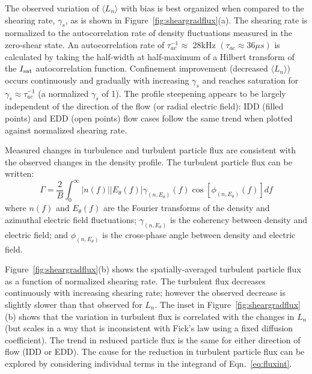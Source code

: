 \documentclass[aps,prl,amsmath,amssymb,preprint,superscriptaddress]{revtex4} %
\begin{document}
The observed variation of $\langle L_{n} \rangle$ with bias is best
organized when compared to the shearing rate, $\gamma_{s}$, as is
shown in Figure~\ref{fig:sheargradflux}(a).   The shearing rate is
normalized to the autocorrelation rate of density fluctuations
measured in the zero-shear state.  An autocorrelation rate of $\tau_{ac}^{-1} \approx $ 28kHz $(\tau_{ac} \approx 36\mu s)$ is calculated by taking the half-width at half-maximum of a Hilbert transform of the $I_{\rm sat}$
autocorrelation function.  Confinement improvement (decreased $\langle
L_n \rangle$) occurs continuously and gradually with increasing
$\gamma_{s}$ and reaches saturation for $\gamma_{s} \approx \tau_{ac}^{-1}$ (a normalized $\gamma_{s}$ of 1).  The profile steepening
appears to be largely independent of the direction of the flow (or radial electric field): IDD (filled points) and EDD (open points) flow cases follow the same trend when plotted against normalized shearing rate.

Measured changes in turbulence and turbulent particle flux are
consistent with the observed changes in the density profile.  The
turbulent particle flux can be written\cite{powers74}:
\begin{equation}
\Gamma = \frac{2}{B} \int^{\infty}_{0} \lvert n(f) \rvert \lvert E_{\theta}(f) \rvert \gamma_{(n,E_{\theta})}(f) \cos [\phi_{(n,E_{\theta})}(f)] df
\label{eq:fluxint}
\end{equation}
where $n(f)$ and $E_\theta(f)$ are the Fourier transforms of
the density and azimuthal electric field fluctuations;
$\gamma_{(n,E_\theta)}$ is the coherency between density and electric
field; and $\phi_{(n,E_\theta)}$ is the cross-phase angle between
density and electric field.

Figure~\ref{fig:sheargradflux}(b) shows the spatially-averaged turbulent
particle flux as a function of normalized shearing rate.  The
turbulent flux decreases continuously with increasing shearing rate;
however the observed decrease is slightly slower than that observed
for $L_n$.  The inset in Figure~\ref{fig:sheargradflux}(b) shows that the variation in
turbulent flux is correlated with the changes in $L_n$ (but scales in a way
that is inconsistent with Fick's law using a fixed diffusion coefficient).  The
trend in reduced particle flux is the same for either direction of
flow (IDD or EDD).  The cause for the reduction in turbulent particle
flux can be explored by considering individual terms in the integrand
of Eqn.~\ref{eq:fluxint}.
\end{document}
